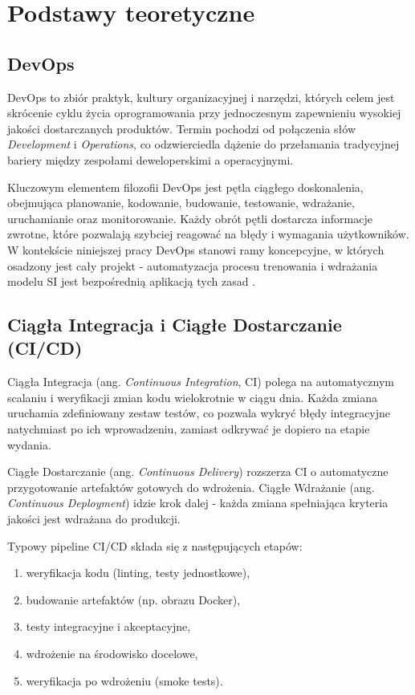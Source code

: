 \section{Podstawy teoretyczne}
\label{sec:Podstawy_teoretyczne}

\subsection{DevOps}

DevOps to zbiór praktyk, kultury organizacyjnej i narzędzi, których celem jest skrócenie cyklu życia oprogramowania przy jednoczesnym zapewnieniu wysokiej jakości dostarczanych produktów. Termin pochodzi od połączenia słów \textit{Development} i \textit{Operations}, co odzwierciedla dążenie do przełamania tradycyjnej bariery między zespołami deweloperskimi a operacyjnymi.

Kluczowym elementem filozofii DevOps jest pętla ciągłego doskonalenia, obejmująca planowanie, kodowanie, budowanie, testowanie, wdrażanie, uruchamianie oraz monitorowanie. Każdy obrót pętli dostarcza informacje zwrotne, które pozwalają szybciej reagować na błędy i wymagania użytkowników. W kontekście niniejszej pracy DevOps stanowi ramy koncepcyjne, w których osadzony jest cały projekt - automatyzacja procesu trenowania i wdrażania modelu SI jest bezpośrednią aplikacją tych zasad \cite{loukides_devops_bookey}.

\subsection{Ciągła Integracja i Ciągłe Dostarczanie (CI/CD)}

Ciągła Integracja (ang. \textit{Continuous Integration}, CI) polega na automatycznym scalaniu i weryfikacji zmian kodu wielokrotnie w ciągu dnia. Każda zmiana uruchamia zdefiniowany zestaw testów, co pozwala wykryć błędy integracyjne natychmiast po ich wprowadzeniu, zamiast odkrywać je dopiero na etapie wydania.

Ciągłe Dostarczanie (ang. \textit{Continuous Delivery}) rozszerza CI o automatyczne przygotowanie artefaktów gotowych do wdrożenia. Ciągłe Wdrażanie (ang. \textit{Continuous Deployment}) idzie krok dalej - każda zmiana spełniająca kryteria jakości jest wdrażana do produkcji.

Typowy pipeline CI/CD składa się z następujących etapów:
\begin{enumerate}
  \item weryfikacja kodu (linting, testy jednostkowe),
  \item budowanie artefaktów (np. obrazu Docker),
  \item testy integracyjne i akceptacyjne,
  \item wdrożenie na środowisko docelowe,
  \item weryfikacja po wdrożeniu (smoke tests).
\end{enumerate}

